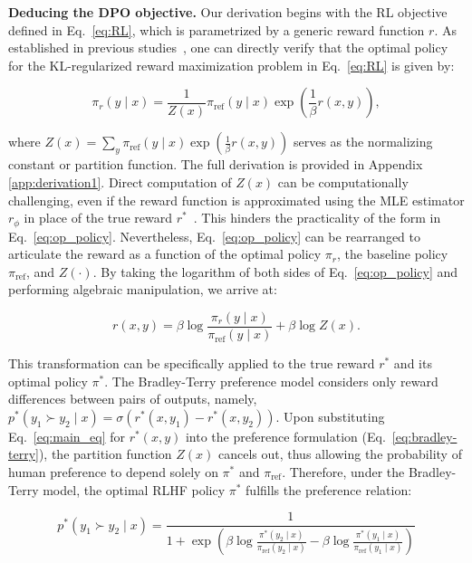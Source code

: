 \textbf{Deducing the DPO objective.} Our derivation begins with the RL objective defined in Eq.~\ref{eq:RL}, which is parametrized by a generic reward function $r$. As established in previous studies~\citep{peters2007reinforcement, peng2019advantage, korbak2022reinforcement, go2023aligning}, one can directly verify that the optimal policy for the KL-regularized reward maximization problem in Eq.~\ref{eq:RL} is given by:

\begin{equation}\label{eq:op_policy}
    \pi_r(y\mid x) = \frac{1}{Z(x)}\pi_\text{ref}(y\mid x)\exp\left(\frac{1}{\beta}r(x, y)\right),
\end{equation}

where $Z(x) =\sum_{y}\pi_\text{ref}(y\mid x)\exp\left(\frac{1}{\beta}r(x, y)\right)$ serves as the normalizing constant or partition function. The full derivation is provided in Appendix \ref{app:derivation1}. Direct computation of $Z(x)$ can be computationally challenging, even if the reward function is approximated using the MLE estimator $r_{\phi}$ in place of the true reward $r^*$~\citep{korbak2022reinforcement, go2023aligning}. This hinders the practicality of the form in Eq.~\ref{eq:op_policy}. Nevertheless, Eq.~\ref{eq:op_policy} can be rearranged to articulate the reward as a function of the optimal policy $\pi_r$, the baseline policy $\pi_\text{ref}$, and $Z(\cdot)$. By taking the logarithm of both sides of Eq.~\ref{eq:op_policy} and performing algebraic manipulation, we arrive at:

\begin{equation}\label{eq:main_eq}
    r(x,y) =\beta \log \frac{\pi_r(y\mid x)}{\pi_\text{ref}(y\mid x)} + \beta \log Z(x).
\end{equation}

This transformation can be specifically applied to the true reward $r^*$ and its optimal policy $\pi^*$. The Bradley-Terry preference model considers only reward differences between pairs of outputs, namely, ${p^*(y_1 \succ y_2 \mid x) = \sigma(r^*(x, y_1) - r^*(x, y_2))}$. Upon substituting Eq.~\ref{eq:main_eq} for $r^*(x,y)$ into the preference formulation (Eq.~\ref{eq:bradley-terry}), the partition function $Z(x)$ cancels out, thus allowing the probability of human preference to depend solely on $\pi^*$ and $\pi_\text{ref}$. Therefore, under the Bradley-Terry model, the optimal RLHF policy $\pi^*$ fulfills the preference relation:

\begin{equation}\label{eq:objective}
    p^*(y_1\succ y_2 \mid x)=\frac{1}{1 + \exp\left(\beta \log \frac{\pi^*(y_2\mid x)}{\pi_\text{ref}(y_2\mid x)} - \beta \log \frac{\pi^*(y_1\mid x)}{\pi_\text{ref}(y_1\mid x)}\right)}
\end{equation}

